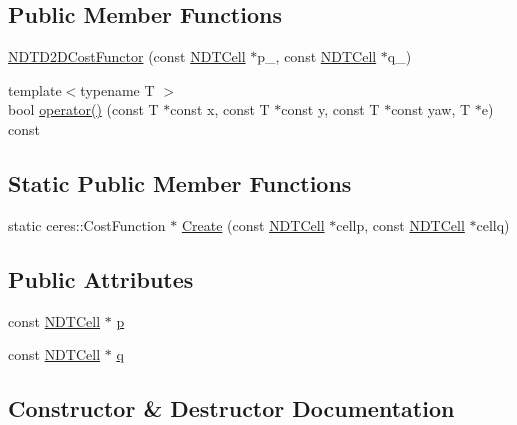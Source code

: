 \subsection*{Public Member Functions}
\begin{DoxyCompactItemize}
\item 
\hyperlink{structNDTD2DCostFunctor_aeb485ed55aaa7fab51e89f5100221224}{N\+D\+T\+D2\+D\+Cost\+Functor} (const \hyperlink{classNDTCell}{N\+D\+T\+Cell} $\ast$p\+\_\+, const \hyperlink{classNDTCell}{N\+D\+T\+Cell} $\ast$q\+\_\+)
\item 
{\footnotesize template$<$typename T $>$ }\\bool \hyperlink{structNDTD2DCostFunctor_afab24c89580155b7ead21cfb111e22fb}{operator()} (const T $\ast$const x, const T $\ast$const y, const T $\ast$const yaw, T $\ast$e) const
\end{DoxyCompactItemize}
\subsection*{Static Public Member Functions}
\begin{DoxyCompactItemize}
\item 
static ceres\+::\+Cost\+Function $\ast$ \hyperlink{structNDTD2DCostFunctor_abfefc323f0a38cca04f81af714a3912a}{Create} (const \hyperlink{classNDTCell}{N\+D\+T\+Cell} $\ast$cellp, const \hyperlink{classNDTCell}{N\+D\+T\+Cell} $\ast$cellq)
\end{DoxyCompactItemize}
\subsection*{Public Attributes}
\begin{DoxyCompactItemize}
\item 
const \hyperlink{classNDTCell}{N\+D\+T\+Cell} $\ast$ \hyperlink{structNDTD2DCostFunctor_accbe8aa1cdccfc8e62fd4a95abbef164}{p}
\item 
const \hyperlink{classNDTCell}{N\+D\+T\+Cell} $\ast$ \hyperlink{structNDTD2DCostFunctor_a936751da6f0d2880109dcfa4060ac341}{q}
\end{DoxyCompactItemize}


\subsection{Constructor \& Destructor Documentation}
\mbox{\label{structNDTD2DCostFunctor_aeb485ed55aaa7fab51e89f5100221224}} 
